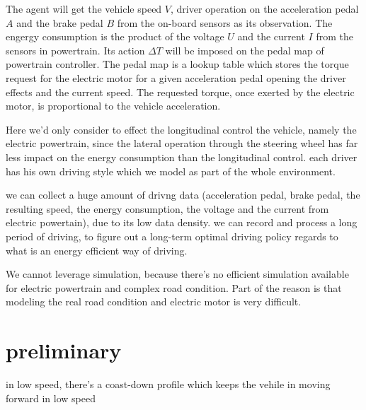 \documentclass{article}
\begin{document}
The agent will get the vehicle speed $V$, driver operation on the acceleration pedal $A$ and the brake pedal $B$ from the on-board sensors as its observation. The engergy consumption is the product of the voltage $U$ and the current $I$ from the sensors in powertrain. Its action $\Delta T$ will be imposed on the pedal map of powertrain controller. The pedal map is a lookup table which stores the torque request for the electric motor for a given acceleration pedal opening the driver effects and the current speed. The requested torque, once exerted by the electric motor, is proportional to the vehicle acceleration.


Here we'd only consider to effect the longitudinal control the vehicle, namely the electric powertrain, since the lateral operation through the steering wheel has far less impact on the energy consumption than the longitudinal control.
each driver has his own driving style which we model as part of the whole environment.

we can collect a huge amount of drivng data (acceleration pedal, brake pedal, the resulting speed, the energy consumption, the voltage and the current from electric powertain), due to its low data density. we can record and process a long period of driving, to figure out a long-term optimal driving policy regards to what is an energy efficient way of driving.


We cannot leverage simulation, because there's no efficient simulation available for electric powertrain and complex road condition. Part of the reason is that modeling the real road condition and electric motor is very difficult.

\section{preliminary}

in low speed, there's a coast-down profile which keeps the vehile in moving forward in low speed
\end{document}
